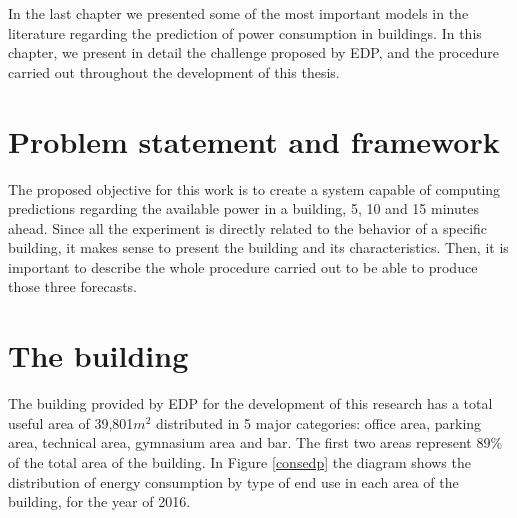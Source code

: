 \cleardoublepage
\label{chap:architecture}


In the last chapter we presented some of the most important models in the literature regarding the prediction of power consumption in buildings. In this chapter, we present in detail the challenge proposed by \ac{EDP}, and the procedure carried out throughout the development of this thesis.

\section{Problem statement and framework}\label{chap3:sec:problem_statement}

The proposed objective for this work is to create a system capable of computing predictions regarding the available power in a building, 5, 10 and 15 minutes ahead. Since all the experiment is directly related to the behavior of a specific building, it makes sense to present the building and its characteristics. Then, it is important to describe the whole procedure carried out to be able to produce those three forecasts.

\section{The building}\label{chap3:sec:building}

The building provided by \ac{EDP} for the development of this research has a total useful area of 39,801$m^2$ distributed in 5 major categories: office area, parking area, technical area, gymnasium area and bar. The first two areas represent 89\% of the total area of the building. In Figure \ref{consedp} the diagram shows the distribution of energy consumption by type of end use in each area of the building, for the year of 2016.

